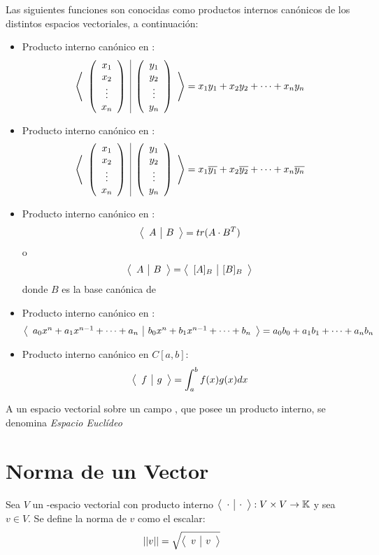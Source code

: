 Las siguientes funciones son conocidas como productos internos canónicos de los distintos espacios vectoriales, a continuación:
\begin{itemize}
    \item Producto interno canónico en \rn:
    $$\left\langle \begin{array}{c|c} \left( \begin{array}{c} x_1\\ x_2\\\vdots\\ x_n \end{array} \right)  & \left( \begin{array}{c} y_1\\ y_2\\\vdots\\ y_n \end{array} \right)  \end{array}\right\rangle = x_1y_1 + x_2y_2 + \cdots + x_ny_n$$
    \item Producto interno canónico en \cn:
    $$\left\langle \begin{array}{c|c} \left( \begin{array}{c} x_1\\ x_2\\\vdots\\ x_n \end{array} \right)  & \left( \begin{array}{c} y_1\\ y_2\\\vdots\\ y_n \end{array} \right)  \end{array}\right\rangle = x_1\overline{y_1} + x_2\overline{y_2} + \cdots + x_n\overline{y_n}$$
    \item Producto interno canónico en \mmxn:
    $$\left\langle \begin{array}{c|c} A & B \end{array}\right\rangle = tr(A\cdot B^T)$$
    \hspace{5,5cm} o
    $$\left\langle \begin{array}{c|c} A & B \end{array}\right\rangle = \left\langle \begin{array}{c|c} [A]_B & [B]_B \end{array}\right\rangle$$
    donde $B$ es la base canónica de \mmxn
    
    \item Producto interno canónico en \pn:
    $$\left\langle \begin{array}{c|c} a_0x^n + a_1x^{n-1}+ \cdots + a_{n} & b_0x^n + b_1x^{n-1} +\cdots + b_{n} \end{array}\right\rangle = a_0 b_0 + a_1 b_1 + \cdots + a_n b_n$$
    
    \item Producto interno canónico en $C[a,b]$:
    $$\left\langle \begin{array}{c|c} f & g \end{array}\right\rangle = \int_a^b f(x)g(x) dx$$
\end{itemize}

\begin{dfn}
A un espacio vectorial sobre un campo \dobleK, que posee un producto interno, se denomina \textit{Espacio Euclídeo}
\end{dfn}

\section{Norma de un Vector}
\begin{dfn}
Sea $V$ un \dobleK-espacio vectorial con producto interno $\left\langle \begin{array}{c|c} \cdot & \cdot \end{array}\right\rangle: V \times V \to \mathbb{K}$ y sea $v \in V$. Se define la norma de $v$ como el escalar:
$$\left|\left| v \right|\right| = \sqrt{\left\langle \begin{array}{c|c} v & v \end{array}\right\rangle} $$
\end{dfn}

